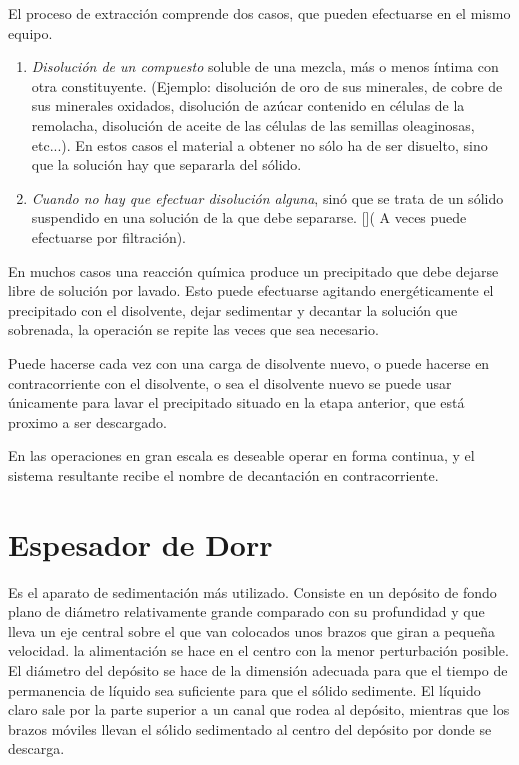 \documentclass[12pt,openany]{book}
\begin{document}
El proceso de extracción comprende dos casos, que pueden efectuarse en el 
mismo equipo.
\begin{enumerate}
    \item \textit{Disolución de un compuesto} soluble de una mezcla, más o menos íntima con 
    otra constituyente. (Ejemplo: disolución de oro de sus minerales, de cobre de sus 
     minerales oxidados, disolución de azúcar contenido en células de la remolacha, disolución 
     de aceite de las células de las semillas oleaginosas, etc...). En estos casos el material 
     a obtener no sólo ha de ser disuelto, sino que la solución hay que separarla del sólido.
     \item \textit{Cuando no hay que efectuar disolución alguna}, sinó que se trata de un sólido 
     suspendido en una solución de la que debe separarse. []( A veces puede efectuarse por filtración).
\end{enumerate}

En muchos casos una reacción química produce un precipitado que debe dejarse libre de solución por 
lavado. Esto puede efectuarse agitando energéticamente el precipitado con el disolvente, dejar sedimentar
y decantar la solución que sobrenada, la operación se repite las veces que sea necesario.

Puede hacerse cada vez con una carga de disolvente nuevo, o puede hacerse en contracorriente con el 
disolvente, o sea el disolvente nuevo se puede usar únicamente para lavar el precipitado situado en la 
etapa anterior, que está proximo a ser descargado.

En las operaciones en gran escala es deseable operar en forma continua, y el sistema resultante 
recibe el nombre de decantación en contracorriente.

\section{Espesador de Dorr}

Es el aparato de sedimentación más utilizado. Consiste en un depósito de fondo plano de diámetro relativamente grande
comparado con su profundidad y que lleva un eje central sobre el que van colocados unos brazos que giran a pequeña
velocidad. la alimentación se hace en el centro con la menor perturbación posible. El diámetro del depósito se hace de la dimensión
adecuada para que el tiempo de permanencia de líquido sea suficiente para que el sólido sedimente. El líquido claro
sale por la parte superior a un canal que rodea al depósito, mientras que los brazos móviles llevan el sólido sedimentado al
centro del depósito por donde se descarga.
\end{document}
